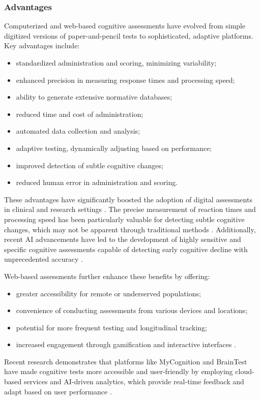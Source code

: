 \subsubsection{Advantages}
Computerized and web-based cognitive assessments have evolved from simple digitized versions of paper-and-pencil tests to sophisticated, adaptive platforms. Key advantages include:
\begin{itemize}
\item standardized administration and scoring, minimizing variability;
\item enhanced precision in measuring response times and processing speed;
\item ability to generate extensive normative databases;
\item reduced time and cost of administration;
\item automated data collection and analysis;
\item adaptive testing, dynamically adjusting based on performance;
\item improved detection of subtle cognitive changes;
\item reduced human error in administration and scoring.
\end{itemize}

These advantages have significantly boosted the adoption of digital assessments in clinical and research settings \cite{Wild2008}. The precise measurement of reaction times and processing speed has been particularly valuable for detecting subtle cognitive changes, which may not be apparent through traditional methods \cite{Zygouris2017}. Additionally, recent AI advancements have led to the development of highly sensitive and specific cognitive assessments capable of detecting early cognitive decline with unprecedented accuracy \cite{Petti2020}.

Web-based assessments further enhance these benefits by offering:
\begin{itemize}
\item greater accessibility for remote or underserved populations;
\item convenience of conducting assessments from various devices and locations;
\item potential for more frequent testing and longitudinal tracking;
\item increased engagement through gamification and interactive interfaces \cite{Lumsden2016}.
\end{itemize}

Recent research demonstrates that platforms like MyCognition and BrainTest have made cognitive tests more accessible and user-friendly by employing cloud-based services and AI-driven analytics, which provide real-time feedback and adapt based on user performance \cite{Wild2021, Grassi2019}.


